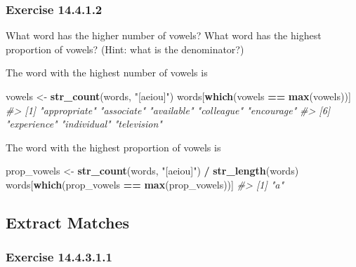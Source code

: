 \documentclass[]{book}
\newenvironment{Shaded}{\begin{snugshade}}{\end{snugshade}}
\newcommand{\CommentTok}[1]{\textcolor[rgb]{0.56,0.35,0.01}{\textit{#1}}}
\newcommand{\KeywordTok}[1]{\textcolor[rgb]{0.13,0.29,0.53}{\textbf{#1}}}
\newcommand{\NormalTok}[1]{#1}
\newcommand{\OperatorTok}[1]{\textcolor[rgb]{0.81,0.36,0.00}{\textbf{#1}}}
\newcommand{\StringTok}[1]{\textcolor[rgb]{0.31,0.60,0.02}{#1}}
\theoremstyle{plain}
\theoremstyle{remark}
\begin{document}
\hypertarget{exercise-14.4.1.2}{%
\subsubsection*{\texorpdfstring{Exercise {14.4.1.2}}{Exercise 14.4.1.2}}\label{exercise-14.4.1.2}}

What word has the higher number of vowels? What word has the highest proportion of vowels? (Hint: what is the denominator?)

The word with the highest number of vowels is

\begin{Shaded}
\begin{Highlighting}[]
\NormalTok{vowels <-}\StringTok{ }\KeywordTok{str_count}\NormalTok{(words, }\StringTok{"[aeiou]"}\NormalTok{)}
\NormalTok{words[}\KeywordTok{which}\NormalTok{(vowels }\OperatorTok{==}\StringTok{ }\KeywordTok{max}\NormalTok{(vowels))]}
\CommentTok{#> [1] "appropriate" "associate"   "available"   "colleague"   "encourage"  }
\CommentTok{#> [6] "experience"  "individual"  "television"}
\end{Highlighting}
\end{Shaded}

The word with the highest proportion of vowels is

\begin{Shaded}
\begin{Highlighting}[]
\NormalTok{prop_vowels <-}\StringTok{ }\KeywordTok{str_count}\NormalTok{(words, }\StringTok{"[aeiou]"}\NormalTok{) }\OperatorTok{/}\StringTok{ }\KeywordTok{str_length}\NormalTok{(words)}
\NormalTok{words[}\KeywordTok{which}\NormalTok{(prop_vowels }\OperatorTok{==}\StringTok{ }\KeywordTok{max}\NormalTok{(prop_vowels))]}
\CommentTok{#> [1] "a"}
\end{Highlighting}
\end{Shaded}

\hypertarget{extract-matches}{%
\subsection{Extract Matches}\label{extract-matches}}

\hypertarget{exercise-14.4.3.1.1}{%
\subsubsection*{\texorpdfstring{Exercise {14.4.3.1.1}}{Exercise 14.4.3.1.1}}\label{exercise-14.4.3.1.1}}
\end{document}
